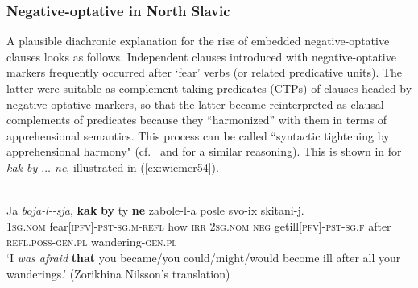 \documentclass[output=paper,colorlinks,citecolor=brown]{langscibook}
\begin{document}
\subsubsection{Negative-optative in North Slavic}
\label{subsubsec:negoptnorthslavic}


A plausible diachronic explanation for the rise of embedded negative-optative clauses looks as follows. Independent clauses introduced with negative-optative markers frequently occurred after `fear' verbs (or related predicative units). The latter were suitable as complement-taking predicates (CTPs) of clauses headed by negative-optative markers, so that the latter became reinterpreted as clausal complements of predicates because they ``harmonized'' with them in terms of apprehensional semantics. This process can be called ``syntactic tightening by apprehensional harmony" (cf.\ \citealt[54]{Nilsson2012} and \citealt[345--346]{Dobrushina2016} for a similar reasoning). This is shown in  for  \textit{kak by $\ldots$  ne}, illustrated in (\ref{ex:wiemer54}).





\ea 
\label{ex:wiemer54} 
\\
\gll Ja \textit{boja-l-\emptyset-sja}, \textbf{kak} \textbf{by} ty \textbf{ne} zabole-l-a posle svo-ix skitani-j. \\
\textsc{1sg.nom} fear\textsc{[ipfv]-pst-sg.m-refl} how \textsc{irr} \textsc{2sg.nom} \textsc{neg} get\textunderscore ill\textsc{[pfv]-pst-sg.f} after \textsc{refl.poss-gen.pl} wandering-\textsc{gen.pl} \\
\glt `I \textit{was afraid} \textbf{that} you became/you could/might/would become ill after all your wanderings.' (Zorikhina Nilsson's translation)
\z
\end{document}
